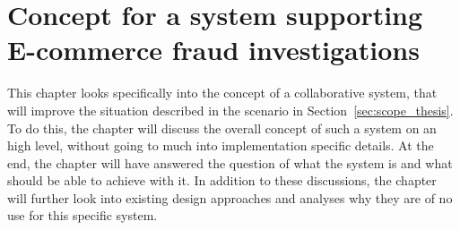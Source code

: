 
\chapter{Concept for a system supporting \gls{E-commerce} fraud investigations} %
\label{cha:system_concept}

This chapter looks specifically into the concept of a collaborative system, that will improve the situation described in the scenario in Section~\ref{sec:scope_thesis}. To do this, the chapter will discuss the overall concept of such a system on an high level, without going to much into implementation specific details. At the end, the chapter will have answered the question of what the system is and what should be able to achieve with it. In addition to these discussions, the chapter will further look into existing design approaches and analyses why they are of no use for this specific system.











